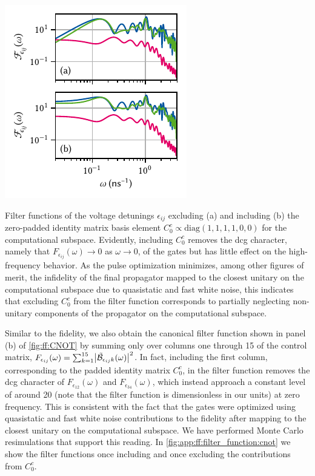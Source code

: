 \begin{marginfigure}[*-3]
    \centering
    \includegraphics{img/pdf/filter_functions/CNOT_FF_unitary_v_complete}
    \caption[]{
        Filter functions of the voltage detunings $\epsilon_{ij}$ excluding (a) and including (b) the zero-padded identity matrix basis element $C_0^c\propto\text{diag}(1,1,1,1,0,0)$ for the computational subspace.
        Evidently, including $C_0^c$ removes the \gls{dcg} character, namely that $F_{\epsilon_{ij}}(\omega)\rightarrow 0$ as $\omega\rightarrow 0$, of the gates but has little effect on the high-frequency behavior.
        As the pulse optimization minimizes, among other figures of merit, the infidelity of the final propagator mapped to the closest unitary on the computational subspace due to quasistatic and fast white noise, this indicates that excluding $C_0^c$ from the filter function corresponds to partially neglecting non-unitary components of the propagator on the computational subspace.
    }
    \label{fig:app:ff:filter_function:cnot}
\end{marginfigure}

Similar to the fidelity, we also obtain the canonical filter function shown in panel (b) of \cref{fig:ff:CNOT} by summing only over columns one through 15 of the control matrix, $F_{\epsilon_{ij}}(\omega) = \sum_{k=1}^{15}\bigl\lvert\tilde{\mathcal{B}}_{\epsilon_{ij} k}(\omega)\bigr\rvert^2$.
In fact, including the first column, corresponding to the padded identity matrix $C_0^c$, in the filter function removes the \gls{dcg} character of $F_{\epsilon_{12}}(\omega)$ and $F_{\epsilon_{34}}(\omega)$, which instead approach a constant level of around 20 (note that the filter function is dimensionless in our units) at zero frequency.
This is consistent with the fact that the gates were optimized using quasistatic and fast white noise contributions to the fidelity after mapping to the closest unitary on the computational subspace.
We have performed Monte Carlo resimulations that support this reading.
In \cref{fig:app:ff:filter_function:cnot} we show the filter functions once including and once excluding the contributions from $C_0^c$.

